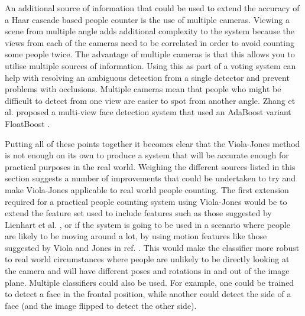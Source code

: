 \documentclass[conference]{IEEEtran}
\begin{document}
An additional source of information that could be used to extend the accuracy of a Haar cascade based people counter is the use of multiple cameras. Viewing a scene from multiple angle adds additional complexity to the system because the views from each of the cameras need to be correlated in order to avoid counting some people twice. The advantage of multiple cameras is that this allows you to utilise multiple sources of information. Using this as part of a voting system can help with resolving an ambiguous detection from a single detector and prevent problems with occlusions. Multiple cameras mean that people who might be difficult to detect from one view are easier to spot from another angle. Zhang et al. \cite{zhang2006robust} proposed a multi-view face detection system that used an AdaBoost variant FloatBoost \cite{li2004floatboost}.

Putting all of these points together it becomes clear that the Viola-Jones method is not enough on its own to produce a system that will be accurate enough for practical purposes in the real world. Weighing the different sources listed in this section suggests a number of improvements that could be undertaken to try and make Viola-Jones applicable to real world people counting. The first extension required for a practical people counting system using Viola-Jones would be to extend the feature set used to include features such as those suggested by Lienhart et al. \cite{lienhart2002extended}, or if the system is going to be used in a scenario where people are likely to be moving around a lot, by using motion features like those suggested by Viola and Jones in ref. \cite{viola2003detecting}. This would make the classifier more robust to real world circumstances where people are unlikely to be directly looking at the camera and will have different poses and rotations in and out of the image plane. Multiple classifiers could also be used. For example, one could be trained to detect a face in the frontal position, while another could detect the side of a face (and the image flipped to detect the other side). 
\end{document}
